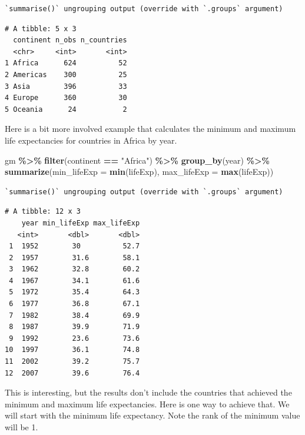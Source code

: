 \documentclass[
]{krantz}
\makeatletter
\newenvironment{Shaded}{\begin{snugshade}}{\end{snugshade}}
\newcommand{\DataTypeTok}[1]{\textcolor[rgb]{0.27,0.27,0.27}{#1}}
\newcommand{\KeywordTok}[1]{\textcolor[rgb]{0.27,0.27,0.27}{\textbf{#1}}}
\newcommand{\NormalTok}[1]{#1}
\newcommand{\OperatorTok}[1]{\textcolor[rgb]{0.43,0.43,0.43}{\textbf{#1}}}
\newcommand{\StringTok}[1]{\textcolor[rgb]{0.5,0.5,0.5}{#1}}
\newenvironment{kframe}{%
\medskip{}
\setlength{\fboxsep}{.8em}
 \def\at@end@of@kframe{}%
 \ifinner\ifhmode%
  \def\at@end@of@kframe{\end{minipage}}%
  \begin{minipage}{\columnwidth}%
 \fi\fi%
 \def\FrameCommand##1{\hskip\@totalleftmargin \hskip-\fboxsep
 \colorbox{shadecolor}{##1}\hskip-\fboxsep
     \hskip-\linewidth \hskip-\@totalleftmargin \hskip\columnwidth}%
 \MakeFramed {\advance\hsize-\width
   \@totalleftmargin\z@ \linewidth\hsize
   \@setminipage}}%
 {\par\unskip\endMakeFramed%
 \at@end@of@kframe}
\renewenvironment{Shaded}{\begin{kframe}}{\end{kframe}}
\makeatother
\begin{document}
\begin{verbatim}
`summarise()` ungrouping output (override with `.groups` argument)
\end{verbatim}

\begin{verbatim}
# A tibble: 5 x 3
  continent n_obs n_countries
  <chr>     <int>       <int>
1 Africa      624          52
2 Americas    300          25
3 Asia        396          33
4 Europe      360          30
5 Oceania      24           2
\end{verbatim}

Here is a bit more involved example that calculates the minimum and maximum life expectancies for countries in Africa by year.

\begin{Shaded}
\begin{Highlighting}[]
\NormalTok{gm }\OperatorTok{\%\textgreater{}\%}
\StringTok{  }\KeywordTok{filter}\NormalTok{(continent }\OperatorTok{==}\StringTok{ "Africa"}\NormalTok{) }\OperatorTok{\%\textgreater{}\%}
\StringTok{  }\KeywordTok{group\_by}\NormalTok{(year) }\OperatorTok{\%\textgreater{}\%}
\StringTok{  }\KeywordTok{summarize}\NormalTok{(}\DataTypeTok{min\_lifeExp =} \KeywordTok{min}\NormalTok{(lifeExp), }\DataTypeTok{max\_lifeExp =} \KeywordTok{max}\NormalTok{(lifeExp))}
\end{Highlighting}
\end{Shaded}

\begin{verbatim}
`summarise()` ungrouping output (override with `.groups` argument)
\end{verbatim}

\begin{verbatim}
# A tibble: 12 x 3
    year min_lifeExp max_lifeExp
   <int>       <dbl>       <dbl>
 1  1952        30          52.7
 2  1957        31.6        58.1
 3  1962        32.8        60.2
 4  1967        34.1        61.6
 5  1972        35.4        64.3
 6  1977        36.8        67.1
 7  1982        38.4        69.9
 8  1987        39.9        71.9
 9  1992        23.6        73.6
10  1997        36.1        74.8
11  2002        39.2        75.7
12  2007        39.6        76.4
\end{verbatim}

This is interesting, but the results don't include the countries that achieved the minimum and maximum life expectancies. Here is one way to achieve that. We will start with the minimum life expectancy. Note the rank of the minimum value will be 1.
\end{document}

